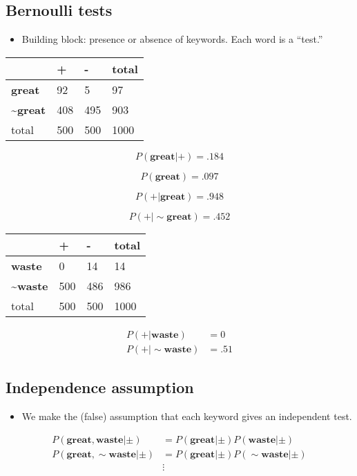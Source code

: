 \documentclass[
]{article}
\providecommand{\tightlist}{%
  \setlength{\itemsep}{0pt}\setlength{\parskip}{0pt}}
\begin{document}
\newpage

\hypertarget{bernoulli-tests}{%
\subsection{Bernoulli tests}\label{bernoulli-tests}}

\begin{itemize}
\tightlist
\item
  Building block: presence or absence of keywords. Each word is a
  ``test.''
\end{itemize}

\begin{longtable}[]{@{}llll@{}}
\toprule
& + & - & total\tabularnewline
\midrule
\endhead
\textbf{great} & 92 & 5 & 97\tabularnewline
\textasciitilde{}\textbf{great} & 408 & 495 & 903\tabularnewline
total & 500 & 500 & 1000\tabularnewline
\bottomrule
\end{longtable}

\[ P (\mathbf{great} | +) =  .184 \]

\[ P(\mathbf{great})  = .097 \]

\[P(+|\mathbf{great}) = .948 \]

\[P(+|\sim\mathbf{great}) = .452\]

\begin{longtable}[]{@{}llll@{}}
\toprule
& + & - & total\tabularnewline
\midrule
\endhead
\textbf{waste} & 0 & 14 & 14\tabularnewline
\textasciitilde{}\textbf{waste} & 500 & 486 & 986\tabularnewline
total & 500 & 500 & 1000\tabularnewline
\bottomrule
\end{longtable}

\begin{align*}
P(+|\mathbf{waste}) &= 0\\
P(+|\sim\mathbf{waste}) &= .51
\end{align*}

\hypertarget{independence-assumption}{%
\subsection{Independence assumption}\label{independence-assumption}}

\begin{itemize}
\tightlist
\item
  We make the (false) assumption that each keyword gives an independent
  test.
\end{itemize}

\begin{align*}
P(\mathbf{great},\mathbf{waste}|\pm) &= P(\mathbf{great}|\pm)P(\mathbf{waste}|\pm)\\
P(\mathbf{great},\sim\mathbf{waste}|\pm) &= P(\mathbf{great}|\pm)P(\sim\mathbf{waste}|\pm)\\
 &\vdots \\
\end{align*}
\end{document}
